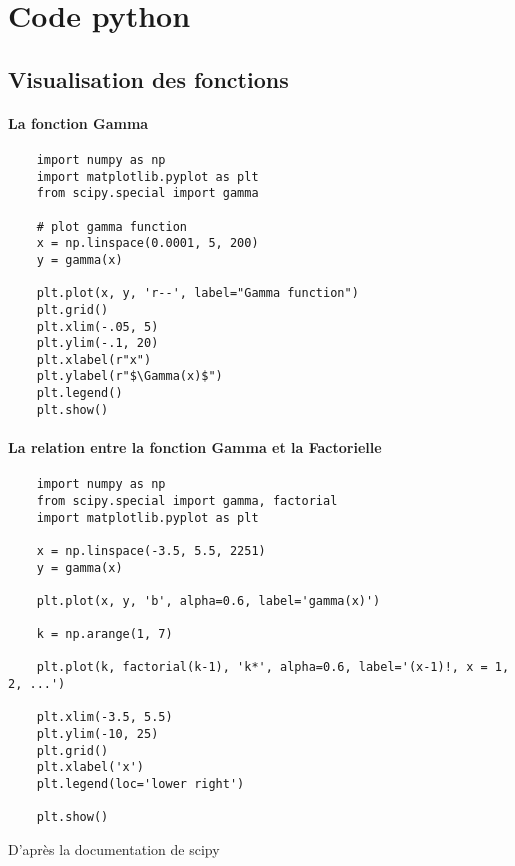 
\chapter{Code python}
\section{Visualisation des fonctions}


\subsubsection*{La fonction Gamma}

\noindent
\begin{verbatim}
    import numpy as np
    import matplotlib.pyplot as plt
    from scipy.special import gamma
    
    # plot gamma function
    x = np.linspace(0.0001, 5, 200)
    y = gamma(x)
    
    plt.plot(x, y, 'r--', label="Gamma function")
    plt.grid()
    plt.xlim(-.05, 5)
    plt.ylim(-.1, 20)
    plt.xlabel(r"x")
    plt.ylabel(r"$\Gamma(x)$")
    plt.legend()
    plt.show()
\end{verbatim}
\subsubsection*{La relation entre la fonction Gamma et la Factorielle
}

\noindent
\begin{verbatim}
    import numpy as np
    from scipy.special import gamma, factorial
    import matplotlib.pyplot as plt
    
    x = np.linspace(-3.5, 5.5, 2251)
    y = gamma(x)
    
    plt.plot(x, y, 'b', alpha=0.6, label='gamma(x)')
    
    k = np.arange(1, 7)
    
    plt.plot(k, factorial(k-1), 'k*', alpha=0.6, label='(x-1)!, x = 1, 2, ...')
    
    plt.xlim(-3.5, 5.5)
    plt.ylim(-10, 25)
    plt.grid()
    plt.xlabel('x')
    plt.legend(loc='lower right')
    
    plt.show()
\end{verbatim}
D'après la documentation de scipy \cite{plot:wiki_gamma}

